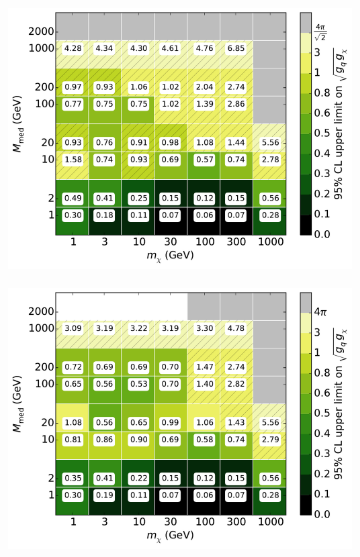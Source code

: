 \begin{figure}[h]
\begin{subfigure}[t]{0.495\textwidth}
      \includegraphics[width=1.\textwidth]{figures/grid_allpoints_SAD_rat05.pdf}
    \end{subfigure}
    \begin{subfigure}[t]{0.495\textwidth}
      \centering
      \includegraphics[width=1.\textwidth]{figures/grid_allpoints_SAD_rat1.pdf}
    \end{subfigure}
    \begin{subfigure}[t]{0.495\textwidth}
      \centering

\end{subfigure}
\end{figure}
